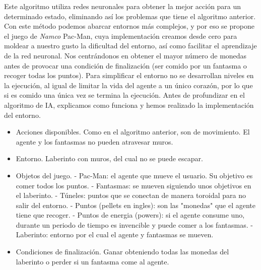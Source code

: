 		Este algoritmo utiliza redes neuronales para obtener la mejor acción para un determinado estado, eliminando así los problemas que tiene el algoritmo anterior. Con este método podemos abarcar entornos más complejos, y por eso se propone el juego de \textit{Namco} Pac-Man, cuya implementación  creamos desde cero para moldear a nuestro gusto la dificultad del entorno, así como facilitar el aprendizaje de la red neuronal. Nos centrándonos en obtener el mayor número de monedas antes de provocar una condición de finalización (ser comido por un fantasma o recoger todas los puntos). Para simplificar el entorno no se desarrollan niveles en la ejecución, al igual de limitar la vida del agente a un único corazón, por lo que si es comido una única vez se termina la ejecución. Antes de profundizar en el algoritmo de IA, explicamos como funciona y hemos realizado la implementación del entorno.
		\vspace{-0.5cm}
		\begin{itemize}		
			\item Acciones disponibles. Como en el algoritmo anterior, son de movimiento. El agente y los fantasmas no pueden atravesar muros.
			\vspace*{-0.2cm}
			\item Entorno. Laberinto con muros, del cual no se puede escapar.
			\item Objetos del juego. 
			\vspace*{-0.3cm}
				\subitem - Pac-Man: el agente que mueve el usuario. Su objetivo es comer todos los puntos.
				\vspace{-1cm}
				\subitem - Fantasmas: se mueven siguiendo unos objetivos en el laberinto.
				\vspace{-0.2cm}
				\subitem - Túneles: puntos que se conectan de manera toroidal para no salir del entorno.
				\vspace{-0.2cm}
				\subitem - Puntos (pellets en ingles): son las "monedas" que el agente tiene que recoger.
				\vspace{-0.2cm}
				\subitem - Puntos de energia (powers): si el agente consume uno, durante un periodo de \hspace*{1.25cm} tiempo es invencible y puede comer a los fantasmas.				
				\vspace{-0.2cm}
				\subitem - Laberinto: entorno por el cual el agente y fantasmas se mueven.
			\vspace*{-0.3cm}
			\item Condiciones de finalización. Ganar obteniendo todas las monedas del laberinto o perder si un fantasma come al agente. 			
		\end{itemize}
		
